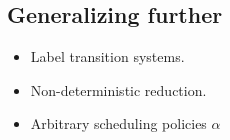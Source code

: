 \subsection{Generalizing further}

\begin{itemize}
\item Label transition systems.
\item Non-deterministic reduction.
\item Arbitrary scheduling policies $\alpha$
\end{itemize}
